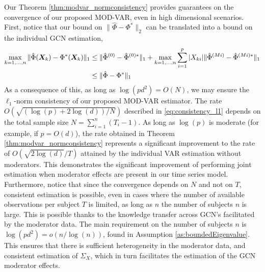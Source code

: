Our Theorem \ref{thm:modvar_normconsistency} provides guarantees on the convergence of our proposed MOD-VAR, even in high dimensional scenarios. First, notice that our bound on $\|\hat\Phi - \Phi^*\|_2$ can be translated into a bound on the individual GCN estimation,
\begin{align*}
	\max_{k=1,...,n} \|\hat\Phi(\bm{X}_k) - \Phi^*(\bm{X}_k) \|_1 &\leq  \|\hat\Phi^{(0)} - \hat\Phi^{(0)*}\|_1 + \max_{k=1,...,n} \sum_{i=1}^p |X_{ki}| \|\hat\Phi^{(Mi)} - \hat\Phi^{(Mi)*}\|_1\\
	&\leq \| \hat \Phi - \Phi^*\|_1
\end{align*}
As a consequence of this, as long as $\log(pd^2)= O(N)$, we may ensure the $\ell_1$-norm consistency of our proposed MOD-VAR estimator. The rate $O(\sqrt{(\log(p) +2\log(d))/N})$ described in \eqref{eq:consistency_l1} depends on the total sample size $N = \sum_{i=1}^n(T_i - 1)$. As long as $\log(p)$ is moderate (for example, if $p = O(d)$), the rate obtained in Theorem \ref{thm:modvar_normconsistency} represents a significant improvement to the rate of $O(\sqrt{2\log(d)}/T)$ attained by the individual VAR estimation without moderators. This demonstrates the significant improvement of performing joint estimation when moderator effects are present in our time series model. Furthermore, notice that since the convergence depends on $N$ and not on $T$, consistent estimation is possible, even in cases where the number of available observations per subject $T$ is limited, as long as $n$ the number of subjects $n$ is large. This is possible thanks to the knowledge transfer across GCN's facilitated by the moderator data. The main requirement on the number of subjects $n$ is $\log(pd^2) = o(n / \log(n))$, found in Assumption \ref{as:boundedEigenvalue}. This ensures that there is sufficient heterogeneity in the moderator data, and consistent estimation of $\Sigma_{X}$, which in turn facilitates the estimation of the GCN moderator effects.




